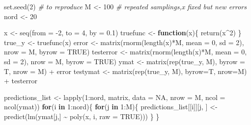 \documentclass[
]{article}
\newenvironment{Shaded}{\begin{snugshade}}{\end{snugshade}}
\newcommand{\AttributeTok}[1]{\textcolor[rgb]{0.77,0.63,0.00}{#1}}
\newcommand{\CommentTok}[1]{\textcolor[rgb]{0.56,0.35,0.01}{\textit{#1}}}
\newcommand{\ConstantTok}[1]{\textcolor[rgb]{0.00,0.00,0.00}{#1}}
\newcommand{\ControlFlowTok}[1]{\textcolor[rgb]{0.13,0.29,0.53}{\textbf{#1}}}
\newcommand{\DecValTok}[1]{\textcolor[rgb]{0.00,0.00,0.81}{#1}}
\newcommand{\FloatTok}[1]{\textcolor[rgb]{0.00,0.00,0.81}{#1}}
\newcommand{\FunctionTok}[1]{\textcolor[rgb]{0.00,0.00,0.00}{#1}}
\newcommand{\NormalTok}[1]{#1}
\newcommand{\OtherTok}[1]{\textcolor[rgb]{0.56,0.35,0.01}{#1}}
\newcommand{\SpecialCharTok}[1]{\textcolor[rgb]{0.00,0.00,0.00}{#1}}
\begin{document}
\begin{Shaded}
\begin{Highlighting}[]
\FunctionTok{set.seed}\NormalTok{(}\DecValTok{2}\NormalTok{) }\CommentTok{\# to reproduce}
\NormalTok{M }\OtherTok{\textless{}{-}} \DecValTok{100} \CommentTok{\# repeated samplings,x fixed but new errors}
\NormalTok{nord }\OtherTok{\textless{}{-}} \DecValTok{20}

\NormalTok{x }\OtherTok{\textless{}{-}} \FunctionTok{seq}\NormalTok{(}\AttributeTok{from =} \SpecialCharTok{{-}}\DecValTok{2}\NormalTok{, }\AttributeTok{to =} \DecValTok{4}\NormalTok{, }\AttributeTok{by =} \FloatTok{0.1}\NormalTok{)}
\NormalTok{truefunc }\OtherTok{\textless{}{-}} \ControlFlowTok{function}\NormalTok{(x)\{}
  \FunctionTok{return}\NormalTok{(x}\SpecialCharTok{\^{}}\DecValTok{2}\NormalTok{)}
\NormalTok{\}}
\NormalTok{true\_y }\OtherTok{\textless{}{-}} \FunctionTok{truefunc}\NormalTok{(x)}
\NormalTok{error }\OtherTok{\textless{}{-}} \FunctionTok{matrix}\NormalTok{(}\FunctionTok{rnorm}\NormalTok{(}\FunctionTok{length}\NormalTok{(x)}\SpecialCharTok{*}\NormalTok{M, }\AttributeTok{mean =} \DecValTok{0}\NormalTok{, }\AttributeTok{sd =} \DecValTok{2}\NormalTok{), }\AttributeTok{nrow =}\NormalTok{ M, }\AttributeTok{byrow =} \ConstantTok{TRUE}\NormalTok{)}
\NormalTok{testerror }\OtherTok{\textless{}{-}} \FunctionTok{matrix}\NormalTok{(}\FunctionTok{rnorm}\NormalTok{(}\FunctionTok{length}\NormalTok{(x)}\SpecialCharTok{*}\NormalTok{M, }\AttributeTok{mean =} \DecValTok{0}\NormalTok{, }\AttributeTok{sd =} \DecValTok{2}\NormalTok{), }\AttributeTok{nrow =}\NormalTok{ M, }\AttributeTok{byrow =} \ConstantTok{TRUE}\NormalTok{)}
\NormalTok{ymat }\OtherTok{\textless{}{-}} \FunctionTok{matrix}\NormalTok{(}\FunctionTok{rep}\NormalTok{(true\_y, M), }\AttributeTok{byrow =}\NormalTok{ T, }\AttributeTok{nrow =}\NormalTok{ M) }\SpecialCharTok{+}\NormalTok{ error}
\NormalTok{testymat }\OtherTok{\textless{}{-}} \FunctionTok{matrix}\NormalTok{(}\FunctionTok{rep}\NormalTok{(true\_y, M), }\AttributeTok{byrow=}\NormalTok{T, }\AttributeTok{nrow=}\NormalTok{M) }\SpecialCharTok{+}\NormalTok{ testerror}

\NormalTok{predictions\_list }\OtherTok{\textless{}{-}} \FunctionTok{lapply}\NormalTok{(}\DecValTok{1}\SpecialCharTok{:}\NormalTok{nord, matrix, }\AttributeTok{data =} \ConstantTok{NA}\NormalTok{, }\AttributeTok{nrow =}\NormalTok{ M, }\AttributeTok{ncol =} \FunctionTok{ncol}\NormalTok{(ymat))}
\ControlFlowTok{for}\NormalTok{(i }\ControlFlowTok{in} \DecValTok{1}\SpecialCharTok{:}\NormalTok{nord)\{}
  \ControlFlowTok{for}\NormalTok{(j }\ControlFlowTok{in} \DecValTok{1}\SpecialCharTok{:}\NormalTok{M)\{}
\NormalTok{    predictions\_list[[i]][j, ] }\OtherTok{\textless{}{-}} \FunctionTok{predict}\NormalTok{(}\FunctionTok{lm}\NormalTok{(ymat[j,] }\SpecialCharTok{\textasciitilde{}} \FunctionTok{poly}\NormalTok{(x, i, }\AttributeTok{raw =} \ConstantTok{TRUE}\NormalTok{)))}
\NormalTok{  \}}
\NormalTok{\}}


\end{Highlighting}
\end{Shaded}
\end{document}
